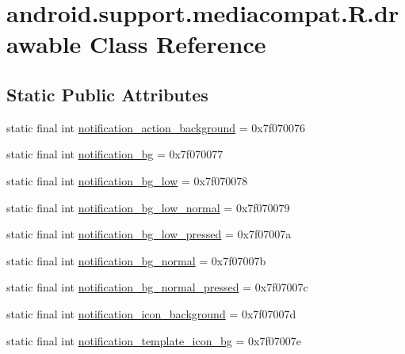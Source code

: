 \hypertarget{classandroid_1_1support_1_1mediacompat_1_1_r_1_1drawable}{}\section{android.\+support.\+mediacompat.\+R.\+drawable Class Reference}
\label{classandroid_1_1support_1_1mediacompat_1_1_r_1_1drawable}
\subsection*{Static Public Attributes}
\begin{DoxyCompactItemize}
\item 
static final int \mbox{\hyperlink{classandroid_1_1support_1_1mediacompat_1_1_r_1_1drawable_a0b69d61f065c3d3b73b5eca274c167f9}{notification\+\_\+action\+\_\+background}} = 0x7f070076
\item 
static final int \mbox{\hyperlink{classandroid_1_1support_1_1mediacompat_1_1_r_1_1drawable_a5fb8e7e3a4bf4505e571d6104e0e1461}{notification\+\_\+bg}} = 0x7f070077
\item 
static final int \mbox{\hyperlink{classandroid_1_1support_1_1mediacompat_1_1_r_1_1drawable_a372ba0df90d8b0b0c4577254c4c3ca7e}{notification\+\_\+bg\+\_\+low}} = 0x7f070078
\item 
static final int \mbox{\hyperlink{classandroid_1_1support_1_1mediacompat_1_1_r_1_1drawable_a83c51af2a9b8ef8129e3ae3769041cac}{notification\+\_\+bg\+\_\+low\+\_\+normal}} = 0x7f070079
\item 
static final int \mbox{\hyperlink{classandroid_1_1support_1_1mediacompat_1_1_r_1_1drawable_abf84a1a876f0f923353c2adf76e5c0f8}{notification\+\_\+bg\+\_\+low\+\_\+pressed}} = 0x7f07007a
\item 
static final int \mbox{\hyperlink{classandroid_1_1support_1_1mediacompat_1_1_r_1_1drawable_a797788319e55c825d7ac2cf98a5e4f05}{notification\+\_\+bg\+\_\+normal}} = 0x7f07007b
\item 
static final int \mbox{\hyperlink{classandroid_1_1support_1_1mediacompat_1_1_r_1_1drawable_aec937cb8ac9686211ac4856d542982ae}{notification\+\_\+bg\+\_\+normal\+\_\+pressed}} = 0x7f07007c
\item 
static final int \mbox{\hyperlink{classandroid_1_1support_1_1mediacompat_1_1_r_1_1drawable_a0accf2aaf207d148b48d1b971fba6fbd}{notification\+\_\+icon\+\_\+background}} = 0x7f07007d
\item 
static final int \mbox{\hyperlink{classandroid_1_1support_1_1mediacompat_1_1_r_1_1drawable_aa77a7cf8c2a1c4c4cb8b2ad8695df81e}{notification\+\_\+template\+\_\+icon\+\_\+bg}} = 0x7f07007e

\end{DoxyCompactItemize}
